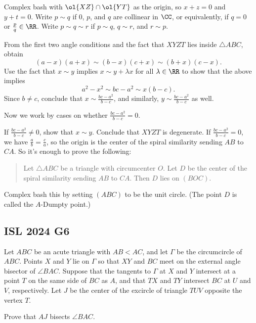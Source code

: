 \documentclass[11pt]{scrartcl}
\begin{document}
\begin{walkthrough}
	Complex bash with $\ol{XZ} \cap \ol{YT}$ as the origin, so $x + z = 0$ and $y + t = 0$. Write $p \sim q$ if $0$, $p$, and $q$ are collinear in $\CC$, or equivalently, if $q = 0$ or $\frac pq \in \RR$. Write $p \sim q \sim r$ if $p \sim q$, $q \sim r$, and $r \sim p$.
	\begin{walk}
		\ii From the first two angle conditions and the fact that $XYZT$ lies inside $\triangle ABC$, obtain
		\[(a - x)(a + x) \sim (b - x)(c + x) \sim (b + x)(c - x).\]
		Use the fact that $x \sim y$ implies $x \sim y + \lambda x$ for all $\lambda \in \RR$ to show that the above implies
		\[a^2 - x^2 \sim bc - a^2 \sim x(b - c).\]
		\ii Since $b \neq c$, conclude that $x \sim \frac{bc - a^2}{b - c}$, and similarly, $y \sim \frac{bc - a^2}{b - c}$ as well.
	\end{walk}
	Now we work by cases on whether $\frac{bc - a^2}{b - c} = 0$.
	\begin{walk}[resume]
		\ii If $\frac{bc - a^2}{b - c} \neq 0$, show that $x \sim y$. Conclude that $XYZT$ is degenerate.
		\ii If $\frac{bc - a^2}{b - c} = 0$, we have $\frac ab = \frac ca$, so the origin is the center of the spiral similarity sending $AB$ to $CA$. So it's enough to prove the following:
		\begin{quote}
			\sffamily\small
			Let $\triangle ABC$ be a triangle with circumcenter $O$. Let $D$ be the center of the spiral similarity sending $AB$ to $CA$. Then $D$ lies on $(BOC)$.
		\end{quote}
		Complex bash this by setting $(ABC)$ to be the unit circle. (The point $D$ is called the $A$-Dumpty point.)
	\end{walk}
\end{walkthrough}

\pagebreak

\subsection{ISL 2024 G6}

\begin{example}[ISL 2024 G6]
	Let $ABC$ be an acute triangle with $AB < AC$, and let $\Gamma$ be the circumcircle of $ABC$. Points $X$ and $Y$ lie on $\Gamma$ so that $XY$ and $BC$ meet on the external angle bisector of $\angle BAC$. Suppose that the tangents to $\Gamma$ at $X$ and $Y$ intersect at a point $T$ on the same side of $BC$ as $A$, and that $TX$ and $TY$ intersect $BC$ at $U$ and $V$, respectively. Let $J$ be the center of the excircle of triangle $TUV$ opposite the vertex $T$.

	Prove that $AJ$ bisects $\angle BAC$.
\end{example}
\end{document}
